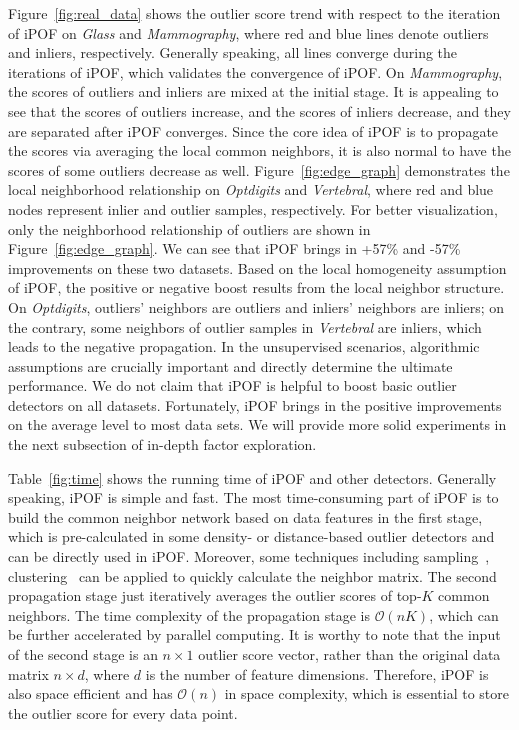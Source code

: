 \documentclass[sigconf,nonacm]{acmart}
\begin{document}
Figure\textcolor{red}{~\ref{fig:real_data}} shows the outlier score trend with respect to the iteration of iPOF on \textit{Glass} and \textit{Mammography}, where red and blue lines denote outliers and inliers, respectively. Generally speaking, all lines converge during the iterations of iPOF, which validates the convergence of iPOF. On \textit{Mammography}, the scores of outliers and inliers are mixed at the initial stage. It is appealing to see that the scores of outliers increase, and the scores of inliers decrease, and they are separated after iPOF converges. Since the core idea of iPOF is to propagate the scores via averaging the local common neighbors, it is also normal to have the scores of some outliers decrease as well. Figure\textcolor{red}{~\ref{fig:edge_graph}} demonstrates the local neighborhood relationship on \textit{Optdigits} and \textit{Vertebral}, where red and blue nodes represent inlier and outlier samples, respectively. For better visualization, only the neighborhood relationship of outliers are shown in  Figure\textcolor{red}{~\ref{fig:edge_graph}}. We can see that iPOF brings in +57\% and -57\% improvements on these two datasets. Based on the local homogeneity assumption of iPOF, the positive or negative boost results from the local neighbor structure. On \textit{Optdigits}, outliers' neighbors are outliers and inliers' neighbors are inliers; on the contrary, some neighbors of outlier samples in \textit{Vertebral} are inliers, which leads to the negative propagation. In the unsupervised scenarios, algorithmic assumptions are crucially important and directly determine the ultimate performance. We do not claim that iPOF is helpful to boost basic outlier detectors on all datasets. Fortunately, iPOF brings in the positive improvements on the average level to most data sets. We will provide more solid experiments in the next subsection of in-depth factor exploration.



Table\textcolor{red}{~\ref{fig:time}} shows the running time of iPOF and other detectors. Generally speaking, iPOF is simple and fast. The most time-consuming part of iPOF is to build the common neighbor network based on data features in the first stage, which is pre-calculated in some density- or distance-based outlier detectors and can be directly used in iPOF. Moreover, some techniques including sampling~\textcolor{gray}{\cite{dudani1976distance}}, clustering~\textcolor{gray}{\cite{brito1997connectivity}} can be applied to quickly calculate the neighbor matrix. The second propagation stage just iteratively averages the outlier scores of top-$K$ common neighbors. The time complexity of the propagation stage is $\mathcal{O}(nK)$, which can be further accelerated by parallel computing. It is worthy to note that the input of the second stage is an $n\times 1$ outlier score vector, rather than the original data matrix $n\times d$, where $d$ is the number of feature dimensions. Therefore, iPOF is also space efficient and has $\mathcal{O}(n)$ in space complexity, which is essential to store the outlier score for every data point.
\end{document}
